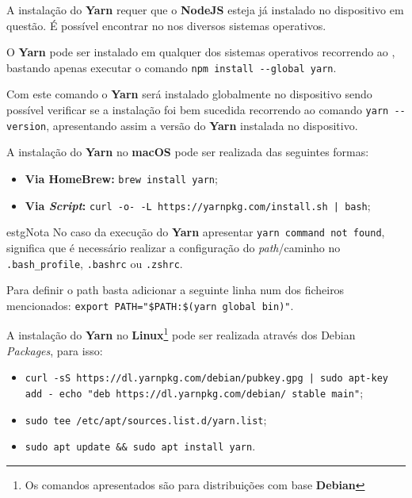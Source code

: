 \label{yarnAttachments}


A instalação do \textbf{Yarn} requer que o \textbf{NodeJS} esteja já instalado no dispositivo em questão. É possível encontrar no  nos diversos sistemas operativos.


O \textbf{Yarn} pode ser instalado em qualquer dos sistemas operativos recorrendo ao \textbf{}, bastando apenas executar o comando \verb|npm install --global yarn|.

Com este comando o \textbf{Yarn} será instalado globalmente no dispositivo sendo possível verificar se a instalação foi bem sucedida recorrendo ao comando \verb|yarn --version|, apresentando assim a versão do \textbf{Yarn} instalada no dispositivo.


A instalação do \textbf{Yarn} no \textbf{macOS} pode ser realizada das seguintes formas:

\begin{itemize}
	\item \textbf{Via HomeBrew:} \texttt{brew install yarn};
	\item \textbf{Via \textit{Script}:} \texttt{curl -o- -L https://yarnpkg.com/install.sh | bash};
\end{itemize}

\begin{mybox}{estg}{Nota}
	No caso da execução do \textbf{Yarn} apresentar \verb|yarn command not found|, significa que é necessário realizar a configuração do \textit{path}/caminho no \verb|.bash_profile|, \verb|.bashrc| ou \verb|.zshrc|.

	\vspace{5pt}

	Para definir o path basta adicionar a seguinte linha num dos ficheiros mencionados: \verb|export PATH="$PATH:$(yarn global bin)"|.
\end{mybox}


A instalação do \textbf{Yarn} no \textbf{Linux}\footnote{Os comandos apresentados são para distribuições com base \textbf{Debian}} pode ser realizada através dos Debian \textit{Packages}, para isso:

\begin{itemize}
	\item \texttt{curl -sS https://dl.yarnpkg.com/debian/pubkey.gpg | sudo apt-key add -
echo "deb https://dl.yarnpkg.com/debian/ stable main"};
	\item \texttt{sudo tee /etc/apt/sources.list.d/yarn.list};
	\item \texttt{sudo apt update && sudo apt install yarn}.
\end{itemize}

